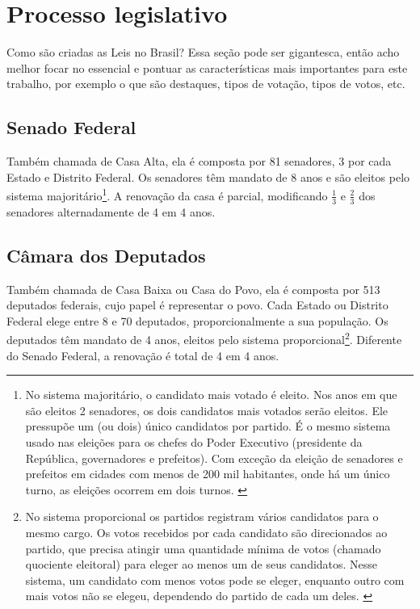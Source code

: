 \section{Processo legislativo}

Como são criadas as Leis no Brasil? Essa seção pode ser gigantesca, então acho melhor focar no essencial e pontuar as características mais importantes para este trabalho, por exemplo o que são destaques, tipos de votação, tipos de votos, etc.

%

\subsection{Senado Federal}

Também chamada de Casa Alta, ela é composta por 81 senadores, 3 por cada Estado e Distrito Federal. Os senadores têm mandato de 8 anos e são eleitos pelo sistema majoritário\footnote{No sistema majoritário, o candidato mais votado é eleito. Nos anos em que são eleitos 2 senadores, os dois candidatos mais votados serão eleitos. Ele pressupõe um (ou dois) único candidatos por partido. É o mesmo sistema usado nas eleições para os chefes do Poder Executivo (presidente da República, governadores e prefeitos). Com exceção da eleição de senadores e prefeitos em cidades com menos de 200 mil habitantes, onde há um único turno, as eleições ocorrem em dois turnos. \cite{Netto2013}}. A renovação da casa é parcial, modificando $\frac{1}{3}$ e $\frac{2}{3}$ dos senadores alternadamente de 4 em 4 anos.

\subsection{Câmara dos Deputados}

Também chamada de Casa Baixa ou Casa do Povo, ela é composta por 513 deputados federais, cujo papel é representar o povo. Cada Estado ou Distrito Federal elege entre 8 e 70 deputados, proporcionalmente a sua população. Os deputados têm mandato de 4 anos, eleitos pelo sistema proporcional\footnote{No sistema proporcional os partidos registram vários candidatos para o mesmo cargo. Os votos recebidos por cada candidato são direcionados ao partido, que precisa atingir uma quantidade mínima de votos (chamado quociente eleitoral) para eleger ao menos um de seus candidatos. Nesse sistema, um candidato com menos votos pode se eleger, enquanto outro com mais votos não se elegeu, dependendo do partido de cada um deles. \cite{Netto2013,Bramatti2014}}. Diferente do Senado Federal, a renovação é total de 4 em 4 anos.

